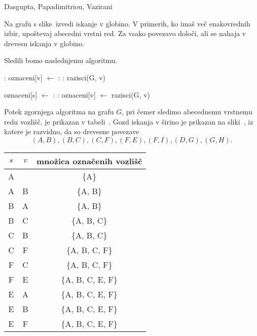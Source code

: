 \begin{naloga}%
{Dasgupta, Papadimitriou, Vazirani}{\cite[Exercise~3.1]{dpv}}
\begin{vprasanje}
Na grafu s slike~\fig[bfs] izvedi iskanje v globino.
V primerih, ko imaš več ena\-ko\-vred\-nih izbir,
upoštevaj abecedni vrstni red.
Za vsako povezavo določi, ali se nahaja v drevesu iskanja v globino.
\end{vprasanje}
\begin{odgovor}

Sledili bomo naslednjemu algoritmu.
\begin{small}
\begin{algorithmic}
	:
		\State oznaceni[v] $\gets$ \False
	\EndFor
	:
		:
			\State razisci(G, v)
		\EndIf
	\EndFor
\end{algorithmic}
\end{small}
%
%
\begin{small}
\begin{algorithmic}
	\State oznaceni[s] $\gets$ \True
		:
			:
				\State oznaceni[v] $\gets$ \True
				\State razisci(G, v)
			\EndIf
		\EndFor		
\end{algorithmic}
\end{small}
%
Potek zgornjega algoritma na grafu $G$,
pri čemer sledimo abecednemu vrstnemu redu vozlišč,
je prikazan v tabeli~\tab.
Gozd iskanja v širino je prikazan na sliki~,
iz katere je razvidno, da so drevesne povezave
$$
(A, B), (B, C), (C, F), (F, E), (F, I), (D, G), (G, H).
$$
\begin{tabela}
\begin{tabular}{c|c|c}
$s$ & $v$ & množica označenih vozlišč \\ \hline
A &   & \{A\} \\
A &B & \{A, B\} \\
B & A &  \{A, B\} \\
B & C &  \{A, B, C\} \\
C & B & \{A, B, C\} \\
C & F & \{A, B, C, F\} \\
F & C & \{A, B, C, F\} \\
F & E & \{A, B, C, E, F\} \\
E & A & \{A, B, C, E, F\} \\
E & B & \{A, B, C, E, F\} \\
E & F & \{A, B, C, E, F\} \\

\end{tabular}
\end{tabela}
\end{odgovor}
\end{naloga}
